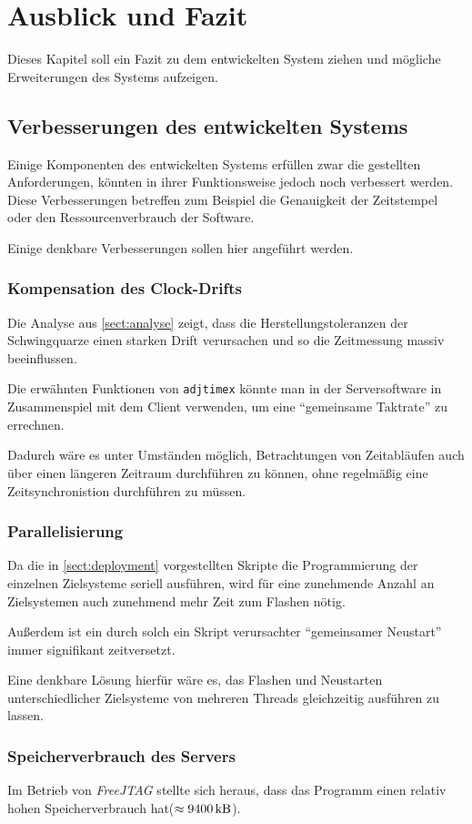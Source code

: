 \chapter{Ausblick und Fazit}\label{chap:ausblick}
Dieses Kapitel soll ein Fazit zu dem entwickelten System ziehen und mögliche
Erweiterungen des Systems aufzeigen.
\section{Verbesserungen des entwickelten Systems}
Einige Komponenten des entwickelten Systems erfüllen zwar die gestellten
Anforderungen, könnten in ihrer Funktionsweise jedoch noch verbessert werden.
Diese Verbesserungen betreffen zum Beispiel die Genauigkeit der Zeitstempel oder
den Ressourcenverbrauch der Software.

Einige denkbare Verbesserungen sollen hier angeführt werden.
\subsection{Kompensation des Clock-Drifts}
Die Analyse aus \autoref{sect:analyse} zeigt, dass die Herstellungstoleranzen
der Schwingquarze einen starken Drift verursachen und so die Zeitmessung massiv
beeinflussen.

Die erwähnten Funktionen von \texttt{adjtimex} könnte man in der Serversoftware
in Zusammenspiel mit dem Client verwenden, um eine "`gemeinsame Taktrate"' zu
errechnen. 

Dadurch wäre es unter Umständen möglich, Betrachtungen von Zeitabläufen auch
über einen längeren Zeitraum durchführen zu können, ohne regelmäßig eine
Zeitsynchronistion durchführen zu müssen.
\subsection{Parallelisierung}
Da die in \autoref{sect:deployment} vorgestellten Skripte die Programmierung der
einzelnen Zielsysteme seriell ausführen, wird für eine zunehmende Anzahl an
Zielsystemen auch zunehmend mehr Zeit zum Flashen nötig.

Außerdem ist ein durch solch ein Skript verursachter "`gemeinsamer Neustart"'
immer signifikant zeitversetzt.

Eine denkbare Lösung hierfür wäre es, das Flashen und Neustarten
unterschiedlicher Zielsysteme von mehreren Threads gleichzeitig ausführen zu
lassen.
\subsection{Speicherverbrauch des Servers}
Im Betrieb von \emph{FreeJTAG} stellte sich heraus, dass das Programm einen
relativ hohen Speicherverbrauch hat($\approx \SI{9400}{\kilo\byte}$). 

